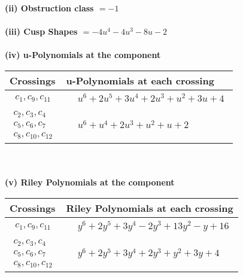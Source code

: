 \documentclass[1p]{elsarticle_modified}
\theoremstyle{definition}
\begin{document}
\flushleft \textbf{(ii) Obstruction class $= -1$}\\~\\
\flushleft \textbf{(iii) Cusp Shapes $= -4 u^4-4 u^3-8 u-2$}\\~\\
\newpage\renewcommand{\arraystretch}{1}
\flushleft \textbf{(iv) u-Polynomials at the component}\newline \\
\begin{tabular}{m{50pt}|m{274pt}}
Crossings & \hspace{64pt}u-Polynomials at each crossing \\
\hline $$\begin{aligned}c_{1},c_{9},c_{11}\end{aligned}$$&$\begin{aligned}
&u^6+2 u^5+3 u^4+2 u^3+u^2+3 u+4
\end{aligned}$\\
\hline $$\begin{aligned}c_{2},c_{3},c_{4}\\c_{5},c_{6},c_{7}\\c_{8},c_{10},c_{12}\end{aligned}$$&$\begin{aligned}
&u^6+u^4+2 u^3+u^2+u+2
\end{aligned}$\\
\hline
\end{tabular}\\~\\
\newpage\renewcommand{\arraystretch}{1}
\flushleft \textbf{(v) Riley Polynomials at the component}\newline \\
\begin{tabular}{m{50pt}|m{274pt}}
Crossings & \hspace{64pt}Riley Polynomials at each crossing \\
\hline $$\begin{aligned}c_{1},c_{9},c_{11}\end{aligned}$$&$\begin{aligned}
&y^6+2 y^5+3 y^4-2 y^3+13 y^2- y+16
\end{aligned}$\\
\hline $$\begin{aligned}c_{2},c_{3},c_{4}\\c_{5},c_{6},c_{7}\\c_{8},c_{10},c_{12}\end{aligned}$$&$\begin{aligned}
&y^6+2 y^5+3 y^4+2 y^3+y^2+3 y+4
\end{aligned}$\\
\hline
\end{tabular}\\~\\
\end{document}
